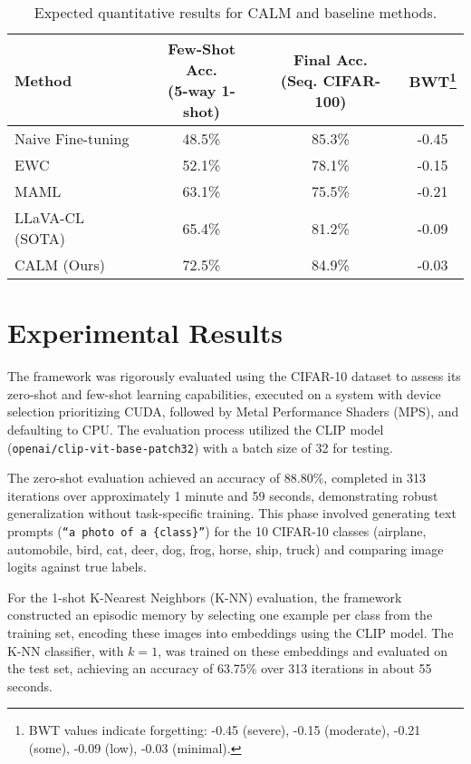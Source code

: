 \documentclass[12pt]{article}
\begin{document}
\begin{table}[h]
\centering
\footnotesize
\begin{tabular}{lccc}
\toprule
\textbf{Method} & \parbox{2.5cm}{\centering \textbf{Few-Shot Acc. \\ (5-way 1-shot)}} & \parbox{2.5cm}{\centering \textbf{Final Acc. \\ (Seq. CIFAR-100)}} & \parbox{2.5cm}{\centering \textbf{BWT}\footnote{BWT values indicate forgetting: -0.45 (severe), -0.15 (moderate), -0.21 (some), -0.09 (low), -0.03 (minimal).}} \\
\midrule
Naive Fine-tuning & 48.5\% & 85.3\% & -0.45 \\
EWC & 52.1\% & 78.1\% & -0.15 \\
MAML & 63.1\% & 75.5\% & -0.21 \\
LLaVA-CL (SOTA) & 65.4\% & 81.2\% & -0.09 \\
CALM (Ours) & 72.5\% & 84.9\% & -0.03 \\
\bottomrule
\end{tabular}
\caption{Expected quantitative results for CALM and baseline methods.}
\end{table}

\section{Experimental Results}
The framework was rigorously evaluated using the CIFAR-10 dataset to assess its zero-shot and few-shot learning capabilities, executed on a system with device selection prioritizing CUDA, followed by Metal Performance Shaders (MPS), and defaulting to CPU. The evaluation process utilized the CLIP model (\texttt{openai/clip-vit-base-patch32}) with a batch size of 32 for testing. 

The zero-shot evaluation achieved an accuracy of 88.80\%, completed in 313 iterations over approximately 1 minute and 59 seconds, demonstrating robust generalization without task-specific training. This phase involved generating text prompts (\texttt{``a photo of a \{class\}''}) for the 10 CIFAR-10 classes (airplane, automobile, bird, cat, deer, dog, frog, horse, ship, truck) and comparing image logits against true labels.

For the 1-shot K-Nearest Neighbors (K-NN) evaluation, the framework constructed an episodic memory by selecting one example per class from the training set, encoding these images into embeddings using the CLIP model. The K-NN classifier, with $k=1$, was trained on these embeddings and evaluated on the test set, achieving an accuracy of 63.75\% over 313 iterations in about 55 seconds. 
\end{document}
